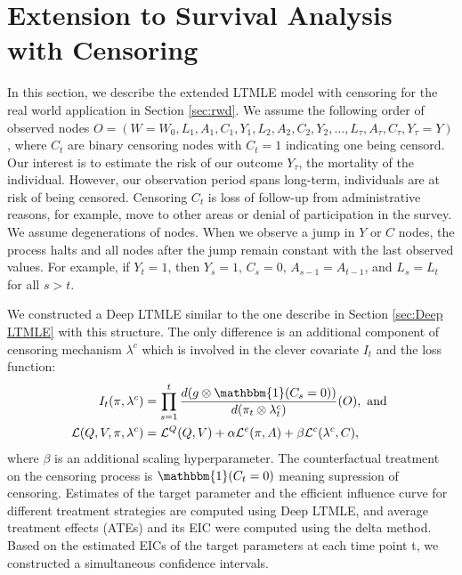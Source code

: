 \documentclass{article}
\theoremstyle{plain}
\theoremstyle{definition}
\theoremstyle{remark}
\begin{document}
\section{Extension to Survival Analysis with Censoring}

\label{sec:extended-model}

In this section, we describe the extended LTMLE model with censoring for the real world application in Section \ref{sec:rwd}. We assume the following order of observed nodes $O=(W=W_0, L_1, A_1, C_1, Y_1 , L_2 , A_2 , C_2 , Y_2 , \ldots , L_\tau , A_\tau , C_\tau , Y_\tau=Y)$, where $C_t$ are binary censoring nodes with $C_t=1$ indicating one being censord. Our interest is to estimate the risk of our outcome $Y_\tau$, the mortality of the individual. However, our observation period spans long-term, individuals are at risk of being censored. Censoring $C_t$ is loss of follow-up from administrative reasons, for example, move to other areas or denial of participation in the survey. We assume degenerations of nodes. When we observe a jump in $Y$ or $C$ nodes, the process halts and all nodes after the jump remain constant with the last observed values. For example, if $Y_t=1$, then $Y_s=1$, $C_s=0$, $A_{s-1}=A_{t-1}$, and $L_s=L_t$ for all $s > t$.


We constructed a Deep LTMLE similar to the one describe in Section \ref{sec:Deep LTMLE} with this structure. The only difference is an additional component of censoring mechanism $\lambda^c$ which is involved in the clever covariate $I_t$ and the loss function:
\begin{align}
    I_t(\pi, \lambda^c) & = \prod_{s=1}^t \frac{d(g\otimes\mathbbm{1}(C_s=0))}{d(\pi_t\otimes \lambda^c_t)}(O), \text{ and }\\
    \mathcal{L}(Q, V, \pi, \lambda^c) &= \mathcal{L}^Q(Q, V) + \alpha\mathcal{L}^e(\pi, A) + \beta\mathcal{L}^c(\lambda^c, C),
\end{align}
where $\beta$ is an additional scaling hyperparameter. The counterfactual treatment on the censoring process is $\mathbbm{1}(C_t=0)$ meaning supression of censoring. Estimates of the target parameter and the efficient influence curve for different treatment strategies are computed using Deep LTMLE, and average treatment effects (ATEs) and its EIC were computed using the delta method. Based on the estimated EICs of the target parameters at each time point t, we constructed a simultaneous confidence intervals. 



\end{document}
